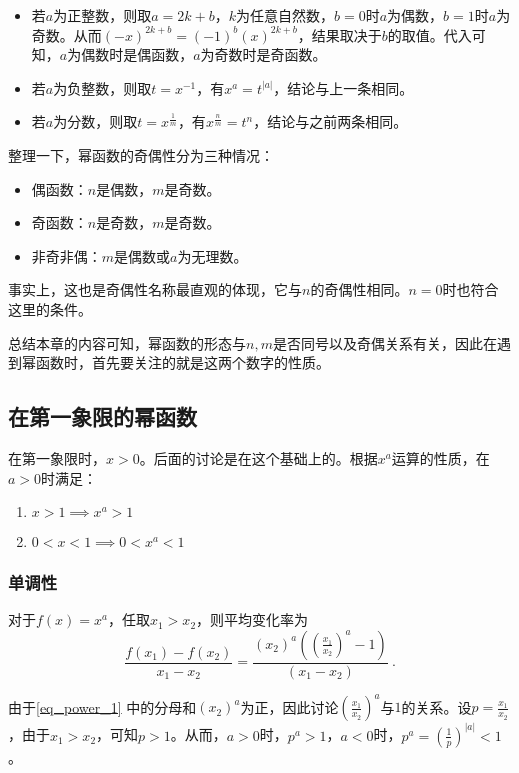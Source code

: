 \begin{itemize}
\item 若$a$为正整数，则取$a=2k+b$，$k$为任意自然数，$b=0$时$a$为偶数，$b=1$时$a$为奇数。从而$(-x)^{2k+b}=(-1)^b(x)^{2k+b}$，结果取决于$b$的取值。代入可知，$a$为偶数时是偶函数，$a$为奇数时是奇函数。
\item 若$a$为负整数，则取$t=x^{-1}$，有$x^a=t^{|a|}$，结论与上一条相同。
\item 若$a$为分数，则取$t=x^\frac{1}{m}$，有$x^\frac{n}{m}=t^{n}$，结论与之前两条相同。
\end{itemize}

整理一下，幂函数的奇偶性分为三种情况：

\begin{itemize}
\item 偶函数：$n$是偶数，$m$是奇数。
\item 奇函数：$n$是奇数，$m$是奇数。
\item 非奇非偶：$m$是偶数或$a$为无理数。
\end{itemize}

事实上，这也是奇偶性名称最直观的体现，它与$n$的奇偶性相同。$n=0$时也符合这里的条件。

总结本章的内容可知，幂函数的形态与$n,m$是否同号以及奇偶关系有关，因此在遇到幂函数时，首先要关注的就是这两个数字的性质。

\subsection{在第一象限的幂函数}

在第一象限时，$x>0$。后面的讨论是在这个基础上的。根据$x^a$运算的性质，在$a>0$时满足：
\begin{enumerate}
\item $x>1\implies x^a>1$
\item $0<x<1\implies 0<x^a<1$
\end{enumerate}

\subsubsection{单调性}
对于$f(x)=x^a$，任取$x_1>x_2$，则平均变化率为
\begin{equation}\label{eq_power_1}
\frac{f(x_1)-f(x_2)}{x_1-x_2}=\frac{(x_2)^a\left(\left(\frac{x_1}{x_2}\right)^a-1\right)}{(x_1-x_2)}~.
\end{equation}

由于\autoref{eq_power_1} 中的分母和$(x_2)^a$为正，因此讨论$\left(\frac{x_1}{x_2}\right)^a$与$1$的关系。设$\displaystyle p=\frac{x_1}{x_2}$，由于$x_1>x_2$，可知$p>1$。从而，$a>0$时，$p^a>1$，$a<0$时，$\displaystyle p^a=\left(\frac{1}{p}\right)^{|a|}<1$。

